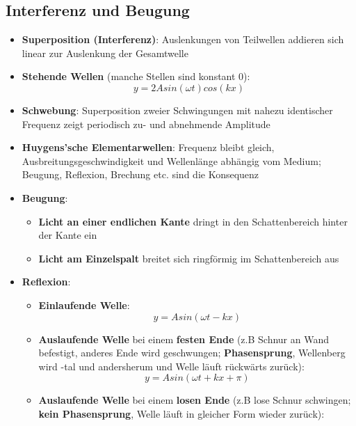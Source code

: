 \subsection{Interferenz und Beugung}%
\label{well:sub:interferenz_und_beugung}

\begin{itemize}
	\item \textbf{Superposition (Interferenz)}: Auslenkungen von Teilwellen addieren sich linear zur Auslenkung der Gesamtwelle
	\item \textbf{Stehende Wellen} (manche Stellen sind konstant $0$):
	\begin{equation}
		y = 2Asin(\omega t)cos(kx)
	\end{equation}
	\item \textbf{Schwebung}: Superposition zweier Schwingungen mit nahezu identischer Frequenz zeigt periodisch zu- und abnehmende Amplitude
	\item \textbf{Huygens'sche Elementarwellen}:  Frequenz bleibt gleich, Ausbreitungsgeschwindigkeit und Wellenlänge abhängig vom Medium; Beugung, Reflexion, Brechung etc. sind die Konsequenz
	\item \textbf{Beugung}:
	\begin{itemize}
		\item \textbf{Licht an einer endlichen Kante} dringt in den Schattenbereich hinter der Kante ein
		\item \textbf{Licht am Einzelspalt} breitet sich ringförmig im Schattenbereich aus
	\end{itemize}
	\item \textbf{Reflexion}:
	\begin{itemize}
		\item \textbf{Einlaufende Welle}:
		\begin{equation}
			y = Asin(\omega t - kx)
		\end{equation}
		\item \textbf{Auslaufende Welle} bei einem \textbf{festen Ende} (z.B Schnur an Wand befestigt, anderes Ende wird geschwungen; \textbf{Phasensprung}, Wellenberg wird -tal und andersherum und Welle läuft rückwärts zurück):
		\begin{equation}
			y = Asin(\omega t + kx + \pi)
		\end{equation}
		\item \textbf{Auslaufende Welle} bei einem \textbf{losen Ende} (z.B lose Schnur schwingen; \textbf{kein Phasensprung}, Welle läuft in gleicher Form wieder zurück):

\end{itemize}
\end{itemize}
